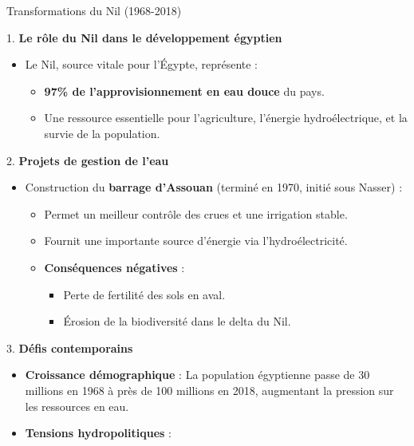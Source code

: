 \documentclass[
  ignorenonframetext,
]{beamer}
\providecommand{\tightlist}{%
  \setlength{\itemsep}{0pt}\setlength{\parskip}{0pt}}\usepackage{longtable,booktabs,array}
\begin{document}
\begin{frame}
\begin{block}{Transformations du Nil (1968-2018)}
\protect\hypertarget{transformations-du-nil-1968-2018}{}
\begin{block}{1. \textbf{Le rôle du Nil dans le développement égyptien}}
\protect\hypertarget{le-ruxf4le-du-nil-dans-le-duxe9veloppement-uxe9gyptien}{}
\begin{itemize}
\tightlist
\item
  Le Nil, source vitale pour l'Égypte, représente :

  \begin{itemize}
  \tightlist
  \item
    \textbf{97\% de l'approvisionnement en eau douce} du pays.
  \item
    Une ressource essentielle pour l'agriculture, l'énergie
    hydroélectrique, et la survie de la population.
  \end{itemize}
\end{itemize}
\end{block}

\begin{block}{2. \textbf{Projets de gestion de l'eau}}
\protect\hypertarget{projets-de-gestion-de-leau}{}
\begin{itemize}
\tightlist
\item
  Construction du \textbf{barrage d'Assouan} (terminé en 1970, initié
  sous Nasser) :

  \begin{itemize}
  \tightlist
  \item
    Permet un meilleur contrôle des crues et une irrigation stable.
  \item
    Fournit une importante source d'énergie via l'hydroélectricité.
  \item
    \textbf{Conséquences négatives} :

    \begin{itemize}
    \tightlist
    \item
      Perte de fertilité des sols en aval.
    \item
      Érosion de la biodiversité dans le delta du Nil.
    \end{itemize}
  \end{itemize}
\end{itemize}
\end{block}

\begin{block}{3. \textbf{Défis contemporains}}
\protect\hypertarget{duxe9fis-contemporains}{}
\begin{itemize}
\tightlist
\item
  \textbf{Croissance démographique} : La population égyptienne passe de
  30 millions en 1968 à près de 100 millions en 2018, augmentant la
  pression sur les ressources en eau.
\item
  \textbf{Tensions hydropolitiques} :


\end{itemize}
\end{block}
\end{block}
\end{frame}
\end{document}
